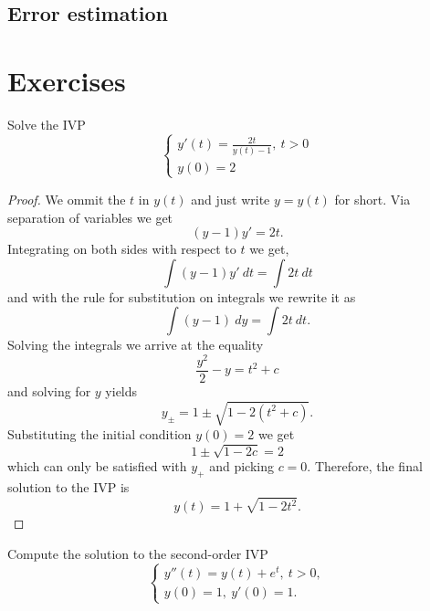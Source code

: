 \subsection{Error estimation}

\section{Exercises}

\begin{ex}

  Solve the IVP
  \[
  \begin{cases}
    y'(t) = \frac{2t}{y(t) - 1} ,\ t > 0 \\
    y(0) = 2
  \end{cases}
  \]
\end{ex}

\begin{proof}
  We ommit the $t$ in $y(t)$ and just write $y = y(t)$ for short.
  Via separation of variables we get
  \[
    (y - 1)y' = 2t. 
  \]
  Integrating on both sides with respect to $t$ we get,
  \[
    \int (y - 1) y'\ dt = \int 2t\ dt
  \]
  and with the rule for substitution on integrals we rewrite it as
  \[
    \int (y - 1)\ dy = \int 2t\ dt.
  \]
  Solving the integrals we arrive at the equality
  \[
  \frac{y^2}{2} - y = t^2 + c
  \]
  and solving for $y$ yields
  \[
    y_\pm = 1 \pm \sqrt{1 - 2(t^2 +c)}.
  \]
  Substituting the initial condition $y(0) = 2$ we get
  \[
    1 \pm \sqrt{1 - 2c} = 2
  \]
  which can only be satisfied with $y_+$ and picking $c = 0$. Therefore, the
  final solution to the IVP is
  \[
   y(t) = 1 + \sqrt{1 - 2t^2}.
  \]
\end{proof}


\begin{ex}

  Compute the solution to the second-order IVP
  \[
  \begin{cases}
    y''(t) = y(t) + e^t,\ t > 0,\\
    y(0) = 1,\ y'(0) = 1.
  \end{cases}
  \]
\end{ex}

